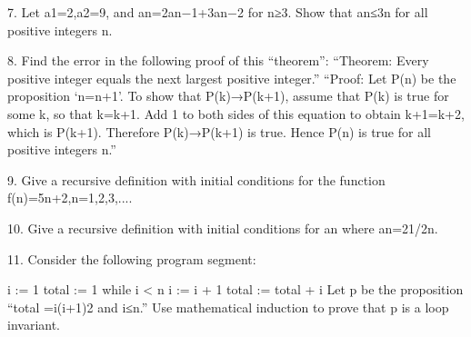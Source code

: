 \documentclass{article}
\begin{document}
\begin{large}
7. Let a1=2,a2=9, and an=2an−1+3an−2 for n≥3. Show that an≤3n for all positive integers n. 

8. Find the error in the following proof of this “theorem”: “Theorem: Every positive integer equals the next largest positive integer.” “Proof: Let P(n) be the proposition ‘n=n+1’. To show that P(k)→P(k+1), assume that P(k) is true for some k, so that k=k+1. Add 1 to both sides of this equation to obtain k+1=k+2, which is P(k+1). Therefore P(k)→P(k+1) is true. Hence P(n) is true for all positive integers n.”

9. Give a recursive definition with initial conditions for the function f(n)=5n+2,n=1,2,3,....

10. Give a recursive definition with initial conditions for {an} where an=21/2n.

11. Consider the following program segment:

i := 1
total := 1 
while i < n
  i := i + 1
  total := total + i
Let p be the proposition “total =i(i+1)2 and i≤n.” Use mathematical induction to prove that p is a loop invariant.

\end{large}
\end{document}

